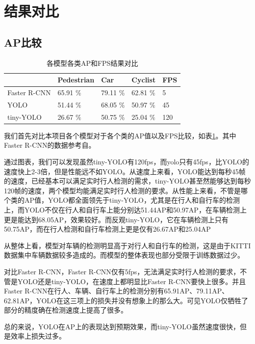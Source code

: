 \section{结果对比}{
	\subsection{AP比较}
	\begin{table}  
	\caption{各模型各类AP和FPS结果对比}  
	\begin{tabular}{l|p{2cm}p{2cm}p{2cm}p{2cm}}  
	\hline  
	             & Pedestrian & Car      & Cyclist  & FPS \\  
	\hline  
	Faster R-CNN & 65.91 \%   & 79.11 \% & 62.81 \% & 5   \\  
	YOLO         & 51.44 \%   & 68.05 \% & 50.97 \% & 45  \\
	tiny-YOLO    & 26.67 \%   & 50.75 \% & 25.04 \% & 120 \\
	\hline
	\end{tabular}
	\label{AP}
	\end{table} 
	我们首先对比本项目各个模型对于各个类的AP值以及FPS比较，如表\ref{AP}。其中Faster R-CNN的数据参考自\cite{}。

	通过图表，我们可以发现虽然tiny-YOLO有120fps，而yolo只有45fps，比YOLO的速度快上2-3倍，但是性能远不如YOLO。从速度上来看，YOLO能达到每秒45帧的速度，已经基本可以满足实时行人检测的需求，tiny-YOLO甚至然能够达到每秒120帧的速度，两个模型均能满足实时行人检测的要求。从性能上来看，不管是哪个类的AP值，YOLO都全面领先于tiny-YOLO，尤其是在行人和自行车的检测上，而YOLO不仅在行人和自行车上能分别达51.44AP和50.97AP，在车辆检测上更是能达到68.05AP，效果较好。而反观tiny-YOLO，它在车辆检测上只有50.75AP，而在行人检测和自行车检测上更是仅有26.67AP和25.04AP

	从整体上看，模型对车辆的检测明显高于对行人和自行车的检测，这是由于KITTI数据集中车辆数据较多造成的。而模型的整体表现也部分受限于训练数据过少。

	对比Faster R-CNN，Faster R-CNN仅有5fps，无法满足实时行人检测的要求，不管是YOLO还是tiny-YOLO，在速度上都明显比Faster R-CNN要快上很多。并且Faster R-CNN在行人、车辆、自行车上的检测分别有65.91AP、79.11AP、62.81AP，YOLO在这三项上的损失并没有想象上的那么大。可见YOLO仅牺牲了部分的精度确在检测速度上提高了很多。

	总的来说，YOLO在AP上的表现达到预期效果，而tiny-YOLO虽然速度很快，但是效率上损失过多。

}
